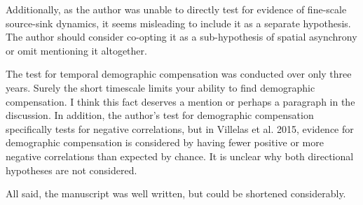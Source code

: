 \documentclass[12pt, letterpaper]{article}
\begin{document}
Additionally, as the author was unable to directly test for evidence of fine-scale source-sink dynamics, it seems misleading to include it as a separate hypothesis. The author should consider co-opting it as a sub-hypothesis of spatial asynchrony or omit mentioning it altogether.

The test for temporal demographic compensation was conducted over only three years. Surely the short timescale limits your ability to find demographic compensation. I think this fact deserves a mention or perhaps a paragraph in the discussion. In addition, the author’s test for demographic compensation specifically tests for negative correlations, but in Villelas et al. 2015, evidence for demographic compensation is considered by having fewer positive or more negative correlations than expected by chance. It is unclear why both directional hypotheses are not considered.

All said, the manuscript was well written, but could be shortened considerably.
\end{document}
